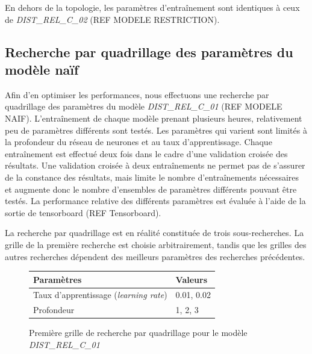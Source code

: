 \par En dehors de la topologie, les paramètres d'entraînement sont identiques à ceux de \emph{DIST\_REL\_C\_02} (REF MODELE RESTRICTION).

\subsection{Recherche par quadrillage des paramètres du modèle naïf}

\par Afin d'en optimiser les performances, nous effectuons une recherche par quadrillage des paramètres du modèle \emph{DIST\_REL\_C\_01} (REF MODELE NAIF). L'entraînement de chaque modèle prenant plusieurs heures, relativement peu de paramètres différents sont testés. Les paramètres qui varient sont limités à la profondeur du réseau de neurones et au taux d'apprentissage. Chaque entraînement est effectué deux fois dans le cadre d'une validation croisée des résultats. Une validation croisée à deux entraînements ne permet pas de s'assurer de la constance des résultats, mais limite le nombre d'entraînements nécessaires et augmente donc le nombre d'ensembles de paramètres différents pouvant être testés. La performance relative des différents paramètres est évaluée à l'aide de la sortie de tensorboard (REF Tensorboard).\\

\par La recherche par quadrillage est en réalité constituée de trois sous-recherches. La grille de la première recherche est choisie arbitrairement, tandis que les grilles des autres recherches dépendent des meilleurs paramètres des recherches précédentes.

\begin{figure}[!h]
	\centering
	
	\begin{tabular}{|l|l|}
		\hline
		\textbf{Paramètres} & \textbf{Valeurs} \\ \hline 
		Taux d'apprentissage (\emph{learning rate}) & 0.01, 0.02 \\ \hline
		Profondeur & 1, 2, 3 \\ \hline
	\end{tabular}		
	
	\caption{Première grille de recherche par quadrillage pour le modèle \emph{DIST\_REL\_C\_01}}
\end{figure}

